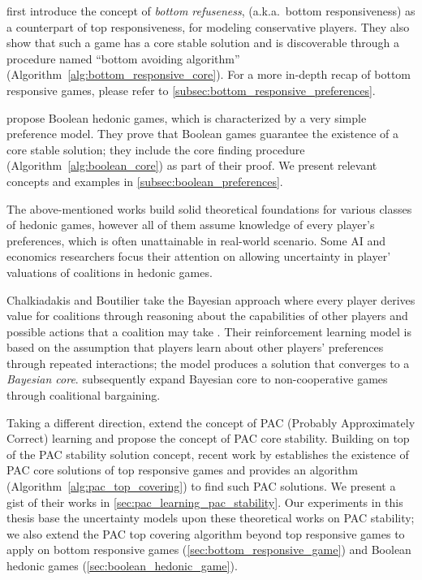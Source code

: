  first introduce the concept of \textit{bottom refuseness},
(a.k.a.\ bottom responsiveness) as a counterpart of top responsiveness, for
modeling conservative players.
They also show that such a game has a core stable solution and is discoverable
through a procedure named ``bottom avoiding algorithm''
(Algorithm~\ref{alg:bottom_responsive_core}).
For a more in-depth recap of bottom responsive games, please refer to
\autoref{subsec:bottom_responsive_preferences}.

 propose Boolean hedonic games,
which is characterized by a very simple preference model.
They prove that Boolean games guarantee the existence of a core stable solution;
they include the core finding procedure (Algorithm~\ref{alg:boolean_core}) as
part of their proof.
We present relevant concepts and examples in
\autoref{subsec:boolean_preferences}.

The above-mentioned works build solid theoretical foundations for various
classes of hedonic games, however all of them assume knowledge of every
player's preferences, which is often unattainable in real-world scenario.
Some AI and economics researchers focus their attention on allowing uncertainty
in player' valuations of coalitions in hedonic games.

Chalkiadakis and Boutilier take the Bayesian approach where every player derives
value for coalitions through reasoning about the capabilities of other players
and possible actions that a coalition may take
\cite{Chalkiadakis2004, Chalkiadakis:2008:SDM:1402383.1402435}.
Their reinforcement learning model is based on the assumption that players
learn about other players' preferences through repeated interactions; the model
produces a solution that converges to a \textit{Bayesian core}.
 subsequently expand Bayesian core to
non-cooperative games through coalitional bargaining.

Taking a different direction, 
extend the concept of PAC (Probably Approximately Correct) learning and
propose the concept of PAC core stability.
Building on top of the PAC stability solution concept, recent work by
 establishes the existence of PAC core solutions
of top responsive games and provides an algorithm
(Algorithm~\ref{alg:pac_top_covering}) to find such PAC solutions.
We present a gist of their works in \autoref{sec:pac_learning_pac_stability}.
Our experiments in this thesis base the uncertainty models upon these theoretical
works on PAC stability; we also extend the PAC top covering algorithm beyond
top responsive games to apply on bottom responsive games
(\autoref{sec:bottom_responsive_game}) and Boolean hedonic games
 (\autoref{sec:boolean_hedonic_game}).

